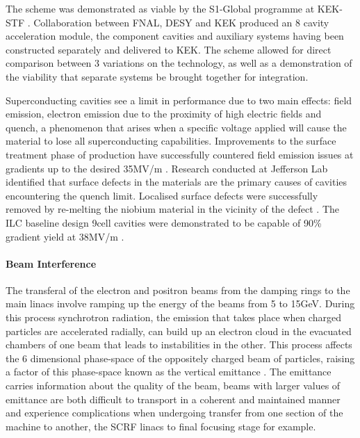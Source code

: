 The scheme was demonstrated as viable by the S1-Global programme at KEK-STF \cite{IPAC:S1Module}. Collaboration between FNAL, DESY and KEK produced an 8 cavity acceleration module, the component cavities and auxiliary systems having been constructed separately and delivered to KEK. The scheme allowed for direct comparison between 3 variations on the technology, as well as a demonstration of the viability that separate systems be brought together for integration.

Superconducting cavities see a limit in performance due to two main effects: field emission, electron emission due to the proximity of high electric fields and quench, a phenomenon that arises when a specific voltage applied will cause the material to lose all superconducting capabilities. Improvements to the surface treatment phase of production have successfully countered field emission issues at gradients up to the desired 35MV/m \cite{ILC:TechnicalDesignReport}. Research conducted at Jefferson Lab identified that surface defects in the materials are the primary causes of cavities encountering the quench limit. Localised surface defects were successfully removed by re-melting the niobium material in the vicinity of the defect \cite{SRF:Gradient}. The ILC baseline design 9\textendash cell cavities were demonstrated to be capable of 90\% gradient yield at 38MV/m \cite{IPAC:SRFGradient}.  

\paragraph{Beam Interference}

The transferal of the electron and positron beams from the damping rings to the main linacs involve ramping up the energy of the beams from 5 to 15GeV. During this process synchrotron radiation, the emission that takes place when charged particles are accelerated radially, can build up an electron cloud in the evacuated chambers of one beam that leads to instabilities in the other. This process affects the 6 dimensional phase-space of the oppositely charged beam of particles, raising a factor of this phase-space known as the vertical emittance \cite{SSolutions:BeamEmittance}. The emittance carries information about the quality of the beam, beams with larger values of emittance are both difficult to transport in a coherent and maintained manner and experience complications when undergoing transfer from one section of the machine to another, the SCRF linacs to final focusing stage for example.

